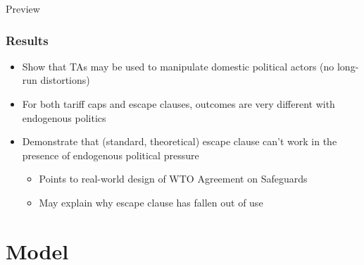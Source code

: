 \documentclass{beamer}
\begin{document}
\begin{frame}{Preview}
\frametitle{Results}

\pause
\begin{itemize}[<+->]
	\item Show that TAs may be used to manipulate domestic political actors (no long-run distortions)
	\item For both tariff caps and escape clauses, outcomes are very different with endogenous politics
	\item Demonstrate that (standard, theoretical) escape clause can't work in the presence of endogenous political pressure
		\begin{itemize}
			\item Points to real-world design of WTO Agreement on Safeguards
			\item May explain why escape clause has fallen out of use
		\end{itemize}
\end{itemize}
\end{frame}

\section{Model}
\end{document}
